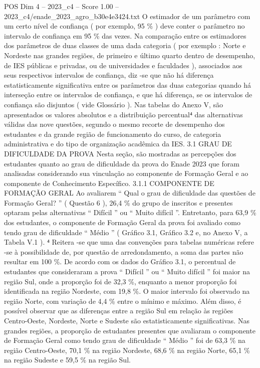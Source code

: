 \begin{textsample}{POS Dim 4 – 2023\_c4 – Score 1.00 – 2023\_c4/enade\_2023\_agro\_b30e4e3424.txt}
O estimador de um parâmetro com um certo nível de confiança ( por exemplo, 95 \% ) deve conter o parâmetro no intervalo de confiança em 95 \% das vezes.
Na comparação entre os estimadores dos parâmetros de duas classes de uma dada categoria ( por exemplo : Norte e Nordeste nas grandes regiões, de primeiro e último quarto dentro de desempenho, de IES públicas e privadas, ou de universidades e faculdades ), associados aos seus respectivos intervalos de confiança, diz -se que não há diferença estatisticamente significativa entre os parâmetros das duas categorias quando há interseção entre os intervalos de confiança, e que há diferença, se os intervalos de confiança são disjuntos ( vide Glossário ).
Nas tabelas do Anexo V, são apresentados os valores absolutos e a distribuição percentual⁴ das alternativas válidas das nove questões, segundo o mesmo recorte de desempenho dos estudantes e da grande região de funcionamento do curso, de categoria administrativa e do tipo de organização acadêmica da IES. 3.1 GRAU DE DIFICULDADE DA PROVA Nesta seção, são mostradas as percepções dos estudantes quanto ao grau de dificuldade da prova do Enade 2023 que foram analisadas considerando sua vinculação ao componente de Formação Geral e ao componente de Conhecimento Específico. 3.1.1 COMPONENTE DE FORMAÇÃO GERAL Ao avaliarem “ Qual o grau de dificuldade das questões de Formação Geral? ” ( Questão 6 ), 26,4 \% do grupo de inscritos e presentes optaram pelas alternativas “ Difícil ” ou “ Muito difícil ”.
Entretanto, para 63,9 \% dos estudantes, o componente de Formação Geral da prova foi avaliado como tendo grau de dificuldade “ Médio ” ( Gráfico 3.1, Gráfico 3.2 e, no Anexo V, a Tabela V.1 ). ⁴ Reitera -se que uma das convenções para tabelas numéricas refere -se à possibilidade de, por questão de arredondamento, a soma das partes não resultar em 100 \%.
De acordo com os dados do Gráfico 3.1, o percentual de estudantes que consideraram a prova “ Difícil ” ou “ Muito difícil ” foi maior na região Sul, onde a proporção foi de 32,3 \%, enquanto a menor proporção foi identificada na região Nordeste, com 19,8 \%.
O maior intervalo foi observado na região Norte, com variação de 4,4 \% entre o mínimo e máximo.
Além disso, é possível observar que as diferenças entre a região Sul em relação às regiões Centro-Oeste, Nordeste, Norte e Sudeste são estatisticamente significativas.
Nas grandes regiões, a proporção de estudantes presentes que avaliaram o componente de Formação Geral como tendo grau de dificuldade “ Médio ” foi de 63,3 \% na região Centro-Oeste, 70,1 \% na região Nordeste, 68,6 \% na região Norte, 65,1 \% na região Sudeste e 59,5 \% na região Sul.

\end{textsample}
